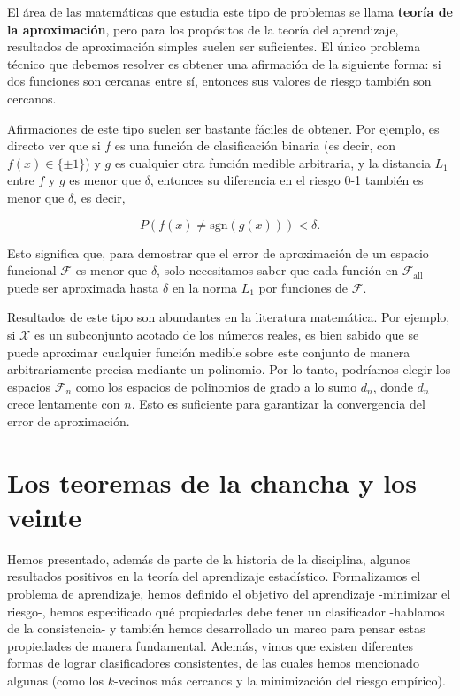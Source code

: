 \documentclass{report}
\begin{document}
El área de las matemáticas que estudia este tipo de problemas se llama \textbf{teoría de la aproximación}, 
pero para los propósitos de la teoría del aprendizaje, resultados de aproximación simples suelen ser 
suficientes. El único 
problema técnico que debemos resolver es obtener una afirmación de la siguiente forma: si dos funciones 
son cercanas entre sí, entonces sus valores de riesgo también son cercanos.

Afirmaciones de este tipo suelen ser bastante fáciles de obtener. Por ejemplo, es directo ver que si 
\(f\) es una función de clasificación binaria (es decir, con \(f(x) \in \{\pm1\}\)) y \(g\) es cualquier 
otra función medible arbitraria, y la distancia \(L_1\) entre \(f\) y \(g\) es menor que \(\delta\), 
entonces su diferencia en el riesgo 0-1 también es menor que \(\delta\), es decir,

\[
P(f(x) \neq \text{sgn}(g(x))) < \delta.
\]

Esto significa que, para demostrar que el error de aproximación de un espacio funcional \(\mathcal{F}\) 
es menor que \(\delta\), solo necesitamos saber que cada función en \(\mathcal{F}_{\text{all}}\) puede 
ser aproximada hasta \(\delta\) en la norma \(L_1\) por funciones de \(\mathcal{F}\).\newline

Resultados de este tipo son abundantes en la literatura matemática. Por ejemplo, si \(\mathcal{X}\) es un subconjunto 
acotado de los números reales, es bien sabido que se puede aproximar cualquier función medible sobre este 
conjunto de manera arbitrariamente precisa mediante un polinomio. Por lo tanto, podríamos elegir los espacios 
\(\mathcal{F}_n\) como los espacios de polinomios de grado a lo sumo \(d_n\), donde \(d_n\) crece lentamente 
con \(n\). Esto es suficiente para garantizar la convergencia del error de aproximación.\newline

\section{Los teoremas de la chancha y los veinte}

Hemos presentado, además de parte de la historia de la disciplina, algunos resultados positivos en la teoría del aprendizaje estadístico. 
Formalizamos el problema de aprendizaje, hemos definido el objetivo del aprendizaje -minimizar el 
riesgo-, hemos especificado qué propiedades debe tener un clasificador -hablamos de la consistencia- y también hemos desarrollado un 
marco para pensar estas propiedades de manera fundamental. Además, vimos que existen 
diferentes formas de lograr clasificadores consistentes, de las cuales hemos mencionado algunas (como los \(k\)-vecinos más cercanos y la 
minimización del riesgo empírico).\newline
\end{document}
